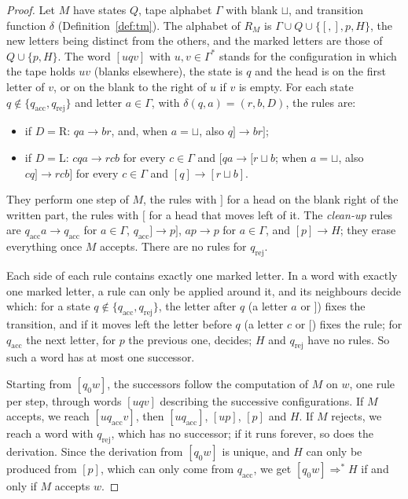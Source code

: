 \begin{proof}
Let $M$ have states $Q$, tape alphabet $\Gamma$ with blank $\sqcup$, and transition function $\delta$ (Definition~\ref{def:tm}). The alphabet of $R_M$ is $\Gamma\cup Q\cup\{[,],p,H\}$, the new letters being distinct from the others, and the marked letters are those of $Q\cup\{p,H\}$. The word $[uqv]$ with $u,v\in\Gamma^*$ stands for the configuration in which the tape holds $uv$ (blanks elsewhere), the state is $q$ and the head is on the first letter of $v$, or on the blank to the right of $u$ if $v$ is empty. For each state $q\notin\{q_{\mathrm{acc}},q_{\mathrm{rej}}\}$ and letter $a\in\Gamma$, with $\delta(q,a)=(r,b,D)$, the rules are:
\begin{itemize}
\item if $D=\mathrm R$: $qa\to br$, and, when $a=\sqcup$, also $q]\to br]$;
\item if $D=\mathrm L$: $cqa\to rcb$ for every $c\in\Gamma$ and $[qa\to[r\sqcup b$; when $a=\sqcup$, also $cq]\to rcb]$ for every $c\in\Gamma$ and $[q]\to[r\sqcup b]$.
\end{itemize}
They perform one step of $M$, the rules with $]$ for a head on the blank right of the written part, the rules with $[$ for a head that moves left of it. The \emph{clean-up} rules are $q_{\mathrm{acc}}a\to q_{\mathrm{acc}}$ for $a\in\Gamma$, $q_{\mathrm{acc}}]\to p]$, $ap\to p$ for $a\in\Gamma$, and $[p]\to H$; they erase everything once $M$ accepts. There are no rules for $q_{\mathrm{rej}}$.

Each side of each rule contains exactly one marked letter. In a word with exactly one marked letter, a rule can only be applied around it, and its neighbours decide which: for a state $q\notin\{q_{\mathrm{acc}},q_{\mathrm{rej}}\}$, the letter after $q$ (a letter $a$ or $]$) fixes the transition, and if it moves left the letter before $q$ (a letter $c$ or $[$) fixes the rule; for $q_{\mathrm{acc}}$ the next letter, for $p$ the previous one, decides; $H$ and $q_{\mathrm{rej}}$ have no rules. So such a word has at most one successor.

Starting from $[q_0w]$, the successors follow the computation of $M$ on $w$, one rule per step, through words $[uqv]$ describing the successive configurations. If $M$ accepts, we reach $[uq_{\mathrm{acc}}v]$, then $[uq_{\mathrm{acc}}]$, $[up]$, $[p]$ and $H$. If $M$ rejects, we reach a word with $q_{\mathrm{rej}}$, which has no successor; if it runs forever, so does the derivation. Since the derivation from $[q_0w]$ is unique, and $H$ can only be produced from $[p]$, which can only come from $q_{\mathrm{acc}}$, we get $[q_0w]\Rightarrow^*H$ if and only if $M$ accepts $w$.
\end{proof}

